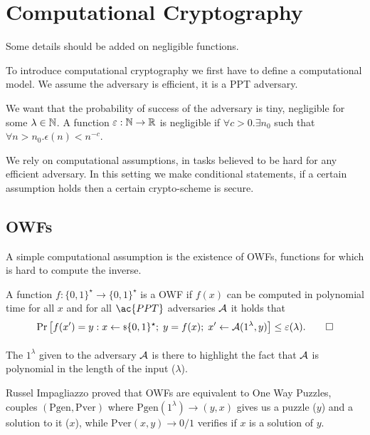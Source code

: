 
\chapter{Computational Cryptography}

\begin{framed}
	Some details should be added on negligible functions.
\end{framed}

To introduce computational cryptography we first have to define a computational model.
We assume the adversary is efficient, \ie it is a \ac{PPT} adversary.

We want that the probability of success of the adversary is tiny, \ie negligible for some $\lambda \in \mathbb{N}$.
A function $\varepsilon : \mathbb{N} \to \mathbb{R}$ is negligible if $\forall c > 0 . \exists n_0$ such that $\forall n > n_0 . \epsilon(n) < n^{-c}$.

We rely on computational assumptions, \ie in tasks believed to be hard for any efficient adversary.
In this setting we make conditional statements, \ie if a certain assumption holds then a certain crypto-scheme is secure.

\section{\aclp{OWF}}

A simple computational assumption is the existence of \acp{OWF}, \ie functions for which is hard to compute the inverse.

\begin{definition}
	A function $f : \{0,1\}^{\star} \to \{0,1\}^{\star}$ is a \ac{OWF} if $f(x)$ can be computed in polynomial time for all $x$ and for all $\ac{PPT}$ adversaries $\mathcal{A}$ it holds that
	\begin{equation*}
		\mathop{\mathrm{Pr}}\limits_{} \left[ {f(x') = y : x \leftarrow {\scriptstyle \$} {\{0,1\}^{\star}}; \; y = f(x); \; x' \leftarrow \mathcal{A}(1^{\lambda}, y)} \right] \le \varepsilon(\lambda). \qedhere
	\end{equation*}
\end{definition}

The $1^{\lambda}$ given to the adversary $\mathcal{A}$ is there to highlight the fact that $\mathcal{A}$ is polynomial in the length of the input ($\lambda$).

Russel Impagliazzo proved that \acp{OWF} are equivalent to One Way Puzzles, \ie couples $(\mathrm{Pgen}, \mathrm{Pver})$ where $\mathrm{Pgen}(1^{\lambda}) \to (y, x)$ gives us a puzzle ($y$) and a solution to it ($x$), while $\mathrm{Pver}(x,y) \to 0/1$ verifies if $x$ is a solution of $y$.

